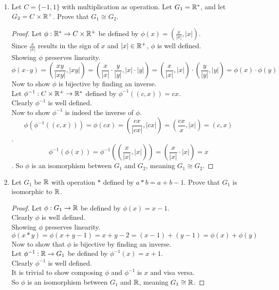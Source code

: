 \documentclass[12pt]{article}
\begin{document}
\begin{enumerate}
		\item Let $C = \{-1, 1\}$ with multiplication as operation. Let $G_1=\mathbb{R}^*$, and let $G_2 = C \times \mathbb{R}^+$. Prove that $G_1 \cong G_2$.
		\begin{proof}
			Let $\phi:\mathbb{R}^*\rightarrow C\times\mathbb{R}^+$ be defined by $\phi(x) = (\frac{x}{|x|},|x|)$.\\
			Since $\frac{x}{|x|}$ results in the sign of $x$ and $|x|\in\mathbb{R}^+$, $\phi$ is well defined.\\
			Showing $\phi$ preserves linearity.\\
			\[\phi(x \cdot y) = \left(\frac{xy}{|xy|},|xy|\right) = \left(\frac{x}{|x|}\cdot\frac{y}{|y|},|x|\cdot|y|\right) = \left(\frac{x}{|x|},|x|\right) \cdot \left(\frac{y}{|y|},|y|\right) = \phi(x)\cdot\phi(y)\]
			Now to show $\phi$ is bijective by finding an inverse.\\
			Let $\phi^{-1}:C\times\mathbb{R}^+\rightarrow\mathbb{R}^*$ defined by $\phi^{-1}((c,x)) = cx$.\\
			Clearly $\phi^{-1}$ is well defined.\\
			Now to show $\phi^{-1}$ is indeed the inverse of $\phi$.\\
			$$\phi(\phi^{-1}((c,x))) = \phi(cx) = (\frac{cx}{|cx|},|cx|) = (\frac{cx}{x},|x|) = (c,x)$$.\\
			$$\phi^{-1}(\phi(x)) = \phi^{-1}((\frac{x}{|x|},|x|)) = (\frac{x}{|x|}\cdot|x|) = x$$.
			So $\phi$ is an isomorphism between $G_1$ and $G_2$, meaning $G_1 \cong G_2$.
		\end{proof}
		
		\item Let $G_1$ be $\mathbb{R}$ with operation $*$ defined by $a*b=a+b-1$. Prove that $G_1$ is isomorphic to $\mathbb{R}$.
		\begin{proof}
			Let $\phi:G_1\rightarrow\mathbb{R}$ be defined by $\phi(x)=x-1$.\\
			Clearly $\phi$ is well defined.\\
			Showing $\phi$ preserves linearity.\\
			\[\phi(x*y) = \phi(x+y-1) = x+y-2 = (x-1) + (y-1) = \phi(x) + \phi(y)\]
			Now to show that $\phi$ is bijective by finding an inverse.\\
			Let $\phi^{-1}:\mathbb{R}\rightarrow G_1$ be defined by $\phi^{-1}(x) = x+1$.\\
			Clearly $\phi^{-1}$ is well defined.\\
			It is trivial to show composing $\phi$ and $\phi^{-1}$ is $x$ and visa versa.\\
			So $\phi$ is an isomorphism between $G_1$ and $\mathbb{R}$, meaning $G_1 \cong \mathbb{R}$.
		\end{proof}
		

\end{enumerate}
\end{document}
